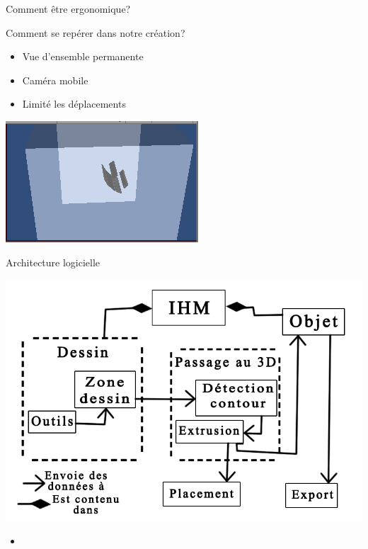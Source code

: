 \documentclass[a4paper,10pt]{beamer}
\begin{document}
		\begin{frame}{Comment être ergonomique?}
			
			Comment se repérer dans notre création?
			
			\begin{itemize}
				\item Vue d'ensemble permanente
				\item Caméra mobile
				\item Limité les déplacements
			\end{itemize}
			
			\centerline{\includegraphics[scale=0.5]{images/Nono/img5.png}} 
			
			
			
		\end{frame}	

	\begin{frame}{Architecture logicielle} %
		\centerline{\includegraphics[scale=0.3]{images/archilogi/archi.png}}
		\begin{itemize}
			\item 
		\end{itemize}
	\end{frame}	
	
\end{document}
